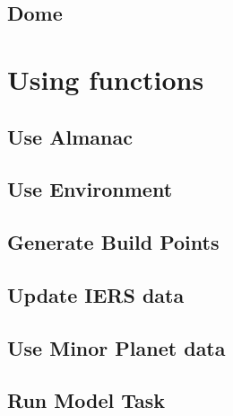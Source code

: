 \documentclass[a4paper,10pt,english]{sphinxmanual}
\begin{document}
\sphinxstepscope


\subsection{Dome}
\label{\detokenize{config/dome/index:dome}}\label{\detokenize{config/dome/index::doc}}
\sphinxstepscope


\section{Using functions}
\label{\detokenize{using/index:using-functions}}\label{\detokenize{using/index::doc}}
\sphinxstepscope


\subsection{Use Almanac}
\label{\detokenize{using/almanac/index:use-almanac}}\label{\detokenize{using/almanac/index::doc}}
\sphinxstepscope


\subsection{Use Environment}
\label{\detokenize{using/environment/index:use-environment}}\label{\detokenize{using/environment/index::doc}}
\sphinxstepscope


\subsection{Generate Build Points}
\label{\detokenize{using/buildpoints/index:generate-build-points}}\label{\detokenize{using/buildpoints/index::doc}}
\sphinxstepscope


\subsection{Update IERS data}
\label{\detokenize{using/iers/index:update-iers-data}}\label{\detokenize{using/iers/index::doc}}
\sphinxstepscope


\subsection{Use Minor Planet data}
\label{\detokenize{using/minorplanets/index:use-minor-planet-data}}\label{\detokenize{using/minorplanets/index::doc}}
\sphinxstepscope


\subsection{Run Model Task}
\label{\detokenize{using/modeling/index:run-model-task}}\label{\detokenize{using/modeling/index::doc}}
\sphinxstepscope
\end{document}
